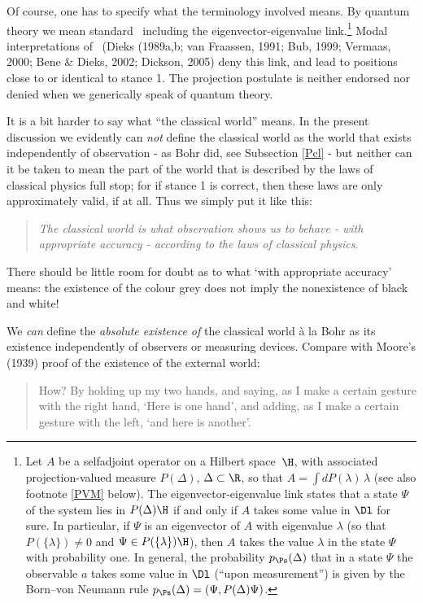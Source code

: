 \documentclass[12pt]{article}
\newcommand{\Hs}{Hilbert space} \newcommand{\Bs}{Banach space}
\newcommand{\lm}{\lambda} \newcommand{\Lm}{\Lambda}
\begin{document}
Of course, one has to specify what the terminology involved means. By quantum theory we mean standard \qm\  including the eigenvector-eigenvalue link.\footnote{Let $A$ be a selfadjoint operator on a \Hs\ $\H$, with associated
projection-valued measure $P(\Delta)$, $\Delta\subset \R$, so that $A=\int dP(\lm)\, \lm$ (see also footnote  \ref{PVM} below). The eigenvector-eigenvalue link states that a state $\Psi$ of the system lies in $P(\Delta)\H$ if and only if $A$ takes some value in $\Dl$ for sure. In particular, if $\Psi$ is an eigenvector of $A$ with eigenvalue $\lm$ (so that $P(\{\lm\})\neq 0$ and $\Psi\in P(\{\lm\})\H$), then $A$ takes the value $\lm$ in the state $\Psi$ with probability one. In general, the probability $p_{\Ps}(\Delta)$ that
in a state $\Psi$ the observable $a$ takes some value in $\Dl$ (``upon measurement'') is given by the Born--von Neumann  rule $p_{\Ps}(\Delta)=(\Psi, P(\Delta)\Psi)$.} 
Modal interpretations of \qm\ (Dieks (1989a,b; van Fraassen, 1991; Bub, 1999; Vermaas, 2000; Bene \& Dieks, 2002; Dickson, 2005) deny this link, and lead to positions  close to or identical to stance 1.
 The projection postulate is neither endorsed nor denied when we generically speak of quantum theory.

 It is a bit harder to say what ``the classical world'' means. In the present discussion we evidently  can {\it not}  define the classical world as the world that exists independently of observation - as Bohr did, see Subsection \ref{Pcl} - but neither can it be taken to mean the
part of the world that is described by the laws of classical physics full stop; for if stance 1 is correct, then  these laws are only approximately valid, if at all. Thus we simply put it like this: 
\begin{quote}{\it The classical world is what observation shows us to behave - with appropriate accuracy - according to the laws of classical physics}.
\end{quote}
There should be little room for doubt as to what `with appropriate accuracy' means: the existence of the colour grey does not imply the nonexistence of black and white!

We {\it can} define the {\it absolute existence of}  the classical world \`{a} la Bohr as its existence  independently of observers or measuring devices. Compare with Moore's (1939)  proof of the existence of the external world:
\begin{quote} 
How? By holding up my two hands, and saying, as I make a certain gesture with the right hand, `Here is one hand', and adding, as I make a certain gesture with the left, `and here is another'.\end{quote}
\end{document}
